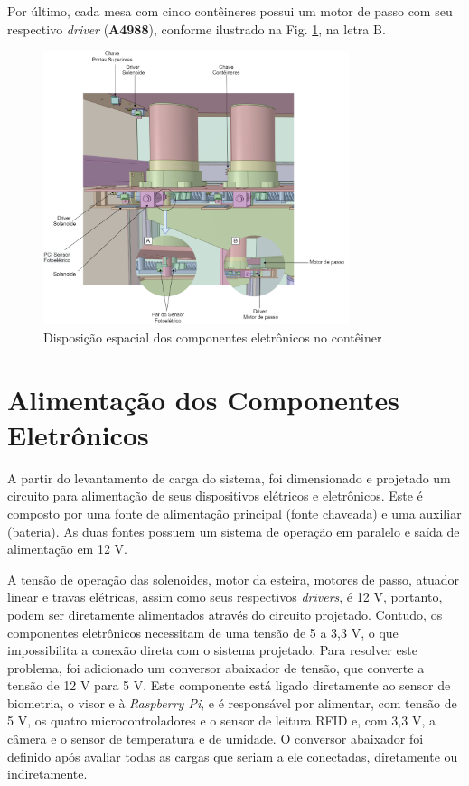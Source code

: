     Por último, cada mesa com cinco contêineres possui um motor de passo com seu respectivo \textit{driver} (\textbf{A4988}), conforme ilustrado na Fig. \ref{fig:integracao_4}, na letra B.
    
    \begin{figure}[H]
        \centering
        \includegraphics[width=0.8\textwidth]{figuras/integracao/integracao_4.png} 
        \caption{Disposição espacial dos componentes eletrônicos no contêiner}
        \label{fig:integracao_4}
    \end{figure}
    
    
\section{Alimentação dos Componentes Eletrônicos}
\label{alimentacao_componentes}

A partir do levantamento de carga do sistema, foi dimensionado e projetado um circuito para alimentação de seus dispositivos elétricos e eletrônicos. Este é composto por uma fonte de alimentação principal (fonte chaveada) e uma auxiliar (bateria). As duas fontes possuem um sistema de operação em paralelo e saída de alimentação em 12 V. 

A tensão de operação das solenoides, motor da esteira, motores de passo, atuador linear e travas elétricas, assim como seus respectivos \textit{drivers}, é 12 V, portanto, podem ser diretamente alimentados através do circuito projetado. Contudo, os componentes eletrônicos necessitam de uma tensão de 5 a 3,3 V, o que impossibilita a conexão direta com o sistema projetado. Para resolver este problema, foi adicionado um conversor abaixador de tensão, que converte a tensão de 12 V para 5 V. Este componente está ligado diretamente ao sensor de biometria, o visor e à \textit{Raspberry Pi}, e é responsável por alimentar, com tensão de 5 V, os quatro microcontroladores e o sensor de leitura RFID e, com 3,3 V, a câmera e o sensor de temperatura e de umidade. O conversor abaixador foi definido após avaliar todas as cargas que seriam a ele conectadas, diretamente ou indiretamente. 

